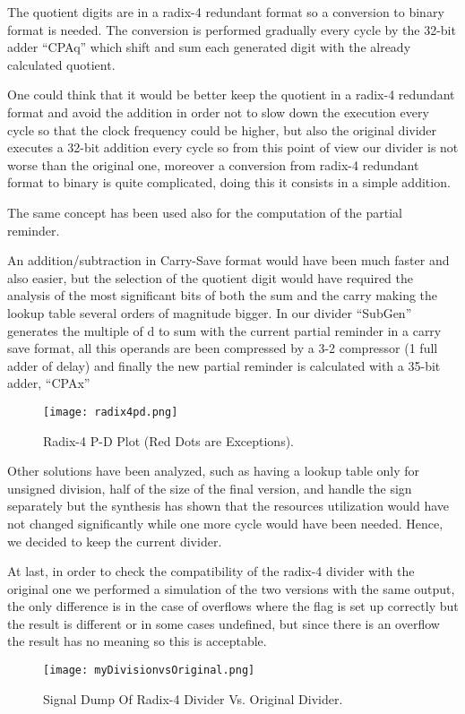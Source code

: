 The quotient digits are in a radix-4 redundant format so a conversion to binary format is needed.
The conversion is performed gradually every cycle by the 32-bit adder ``CPAq'' which shift and sum
each generated digit with the already calculated quotient.

One could think that it would be better keep the quotient in a radix-4 redundant format and avoid
the addition in order not to slow down the execution every cycle so that the clock frequency could
be higher, but also the original divider executes a 32-bit addition every cycle so from this point of
view our divider is not worse than the original one, moreover a conversion from radix-4 redundant
format to binary is quite complicated, doing this it consists in a simple addition.

The same concept has been used also for the computation of the partial reminder.

An addition/subtraction in Carry-Save format would have been much faster and also easier, but
the selection of the quotient digit would have required the analysis of the most significant bits of
both the sum and the carry making the lookup table several orders of magnitude bigger.
In our divider ``SubGen'' generates the multiple of d to sum with the current partial reminder in a
carry save format, all this operands are been compressed by a 3-2 compressor (1 full adder of
delay) and finally the new partial reminder is calculated with a 35-bit adder, ``CPAx''

\begin{figure}[H]
\centering
\texttt{[image: radix4pd.png]}
\caption{Radix-4 P-D Plot (Red Dots are Exceptions).}
\label{fig:div_pd_plot}
\end{figure}

Other solutions have been analyzed, such as having a lookup table only for unsigned division, half
of the size of the final version, and handle the sign separately but the synthesis has shown that the
resources utilization would have not changed significantly while one more cycle would have been needed.
Hence, we decided to keep the current divider.

At last, in order to check the compatibility of the radix-4 divider with the original one we
performed a simulation of the two versions with the same output, the only difference is in the
case of overflows where the flag is set up correctly but the result is different or in some cases
undefined, but since there is an overflow the result has no meaning so this is acceptable.

\begin{figure}[H]
\centering
\texttt{[image: myDivisionvsOriginal.png]}
\caption{Signal Dump Of Radix-4 Divider Vs. Original Divider.}
\label{fig:div32_wave}
\end{figure}
